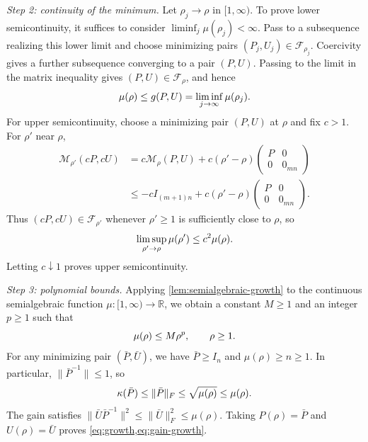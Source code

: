 \documentclass[twocolumn]{autart}
\newcounter{part}
\begin{document}
\begin{pf}
\emph{Step 2: continuity of the minimum.}
Let $\rho_j\to\rho$ in $[1,\infty)$. To prove lower semicontinuity,
it suffices to consider $\liminf_j\mu(\rho_j)<\infty$. Pass to a
subsequence realizing this lower limit and choose minimizing pairs
$(P_j,U_j)\in\mathscr F_{\rho_j}$. Coercivity gives a further
subsequence converging to a pair $(P,U)$. Passing to the limit in the
matrix inequality gives $(P,U)\in\mathscr F_\rho$, and hence\vspace{-2mm}
\begin{equation*}
\mu(\rho)\leq g(P,U)=\liminf_{j\to\infty}\mu(\rho_j).\vspace{-2mm}
\end{equation*}
For upper semicontinuity, choose a minimizing pair $(P,U)$ at $\rho$
and fix $c>1$. For $\rho'$ near $\rho$,\vspace{-2mm}
\begin{align*}
\mathcal M_{\rho'}(cP,cU)
&=c\mathcal M_\rho(P,U)
+c(\rho'-\rho)\begin{pmatrix}P&0\\[-5pt]0&0_{mn}\end{pmatrix}\\
&\leq -cI_{(m+1)n}
+c(\rho'-\rho)\begin{pmatrix}P&0\\[-5pt]0&0_{mn}\end{pmatrix}.
\end{align*}
Thus $(cP,cU)\in\mathscr F_{\rho'}$ whenever $\rho'\geq1$ is
sufficiently close to $\rho$, so\vspace{-2mm}
\begin{equation*}
\limsup_{\rho'\to\rho}\mu(\rho')\leq c^2\mu(\rho).\vspace{-2mm}
\end{equation*}
Letting $c\downarrow1$ proves upper semicontinuity.

 

\emph{Step 3: polynomial bounds.}
Applying \cref{lem:semialgebraic-growth} to the continuous
semialgebraic function $\mu:[1,\infty)\to\mathbb R$, we obtain
a constant $M\geq1$ and an integer $p\geq1$ such that\vspace{-2mm}
\begin{equation*}
\mu(\rho)\leq M\rho^p,\qquad \rho\geq1.\vspace{-2mm}
\end{equation*}
For any minimizing pair $(\bar P,\bar U)$, we have $\bar P\geq  I_n$
and $\mu(\rho)\geq n\geq1$. In particular,
$\lVert\bar P^{-1}\rVert\leq1$, so\vspace{-3mm}
\begin{equation*}
\kappa(\bar P)\leq\lVert\bar P\rVert_F
\leq\sqrt{\mu(\rho)}\leq\mu(\rho).\vspace{-3mm}
\end{equation*}
The gain satisfies $
\bigl\lVert\bar U\bar P^{-1}\bigr\rVert^2
\leq\lVert\bar U\rVert_F^2\leq\mu(\rho).$
Taking $P(\rho)=\bar P$ and $U(\rho)=\bar U$ proves
\cref{eq:growth,eq:gain-growth}.
\end{pf}
\end{document}
